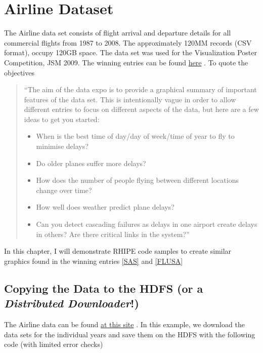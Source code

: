 \documentclass[letterpaper,10pt,english]{sphinxmanual}
\begin{document}
\chapter{Airline Dataset}
\label{airline:airline-dataset}\label{airline::doc}
The Airline data set consists of flight arrival and departure details for all
commercial flights from 1987 to 2008. The approximately 120MM records (CSV format),  occupy
120GB space. The data set was used for the Visualization Poster Competition, JSM
2009. The winning entries can be found \href{http://stat-computing.org/dataexpo/2009/}{here} .
To quote the objectives
\begin{quote}

``The aim of the data expo is to provide a graphical summary of important
features of the data set. This is intentionally vague in order to allow
different entries to focus on different aspects of the data, but here are a
few ideas to get you started:
\begin{itemize}
\item {} 
When is the best time of day/day of week/time of year to fly to minimise delays?

\item {} 
Do older planes suffer more delays?

\item {} 
How does the number of people flying between different locations change over time?

\item {} 
How well does weather predict plane delays?

\item {} 
Can you detect cascading failures as delays in one airport create delays in
others? Are there critical links in the system?''

\end{itemize}
\end{quote}

In this chapter, I will demonstrate RHIPE code samples to create similar
graphics found in the winning entries {\hyperref[airline:sas]{{[}SAS{]}}} and {\hyperref[airline:flusa]{{[}FLUSA{]}}}


\section{Copying the Data to the HDFS (or a \emph{Distributed Downloader}!)}
\label{airline:copying-the-data-to-the-hdfs-or-a-distributed-downloader}
\label{airline:downloading-airline-data}
The Airline data can be found \href{http://stat-computing.org/dataexpo/2009/the-data.html}{at this site} .
In this example, we download the data sets for the individual years and save
them on the HDFS with the following code (with limited error checks)
\end{document}
